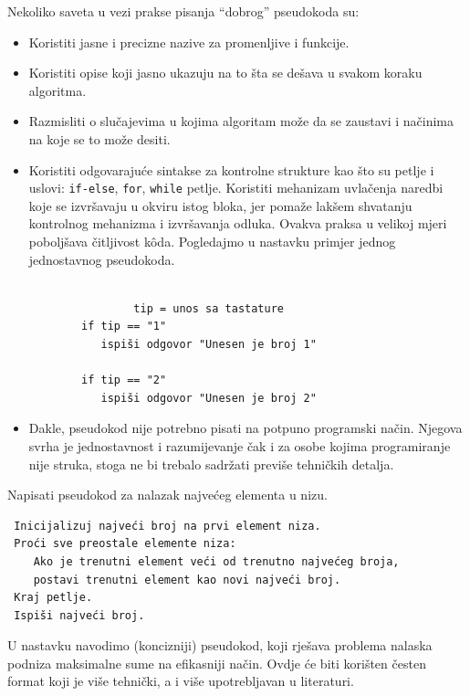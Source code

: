 Nekoliko saveta u vezi prakse pisanja ``dobrog''  pseudokoda su:
\begin{itemize}
	\item Koristiti jasne i precizne nazive za promenljive i funkcije.
	\item Koristiti opise koji jasno ukazuju na to šta se dešava u svakom koraku algoritma. 
	\item Razmisliti o slučajevima u kojima algoritam može da se zaustavi i načinima na koje  se to može desiti.
	\item Koristiti odgovarajuće sintakse za kontrolne strukture kao što su petlje i uslovi: \texttt{if-else}, \texttt{for}, \texttt{while} petlje. Koristiti mehanizam uvlačenja naredbi koje se izvršavaju u okviru istog bloka, jer pomaže lakšem shvatanju kontrolnog mehanizma i izvršavanja odluka. Ovakva praksa u velikoj mjeri poboljšava čitljivost k\^oda. Pogledajmo u nastavku primjer jednog jednostavnog pseudokoda.
	
	\begin{verbatim}
        
                tip = unos sa tastature
		if tip == "1"
		   ispiši odgovor "Unesen je broj 1"
		
		if tip == "2"
		   ispiši odgovor "Unesen je broj 2"
	\end{verbatim}
	
	\item Dakle, pseudokod nije potrebno pisati na potpuno programski način. Njegova svrha je jednostavnost i razumijevanje čak i za osobe kojima programiranje nije struka, stoga ne bi trebalo sadržati previše tehničkih detalja.
\end{itemize}

\begin{example} Napisati pseudokod za nalazak najvećeg elementa u nizu. \\
 \begin{verbatim}
 Inicijalizuj najveći broj na prvi element niza.
 Proći sve preostale elemente niza: 
    Ako je trenutni element veći od trenutno najvećeg broja,
    postavi trenutni element kao novi najveći broj.
 Kraj petlje.
 Ispiši najveći broj.
 \end{verbatim}
 
\end{example}

U nastavku navodimo (koncizniji) pseudokod, koji rješava problema nalaska podniza  maksimalne sume na efikasniji način. Ovdje će biti korišten česten format koji je više tehnički, a i više upotrebljavan u literaturi. 
 
